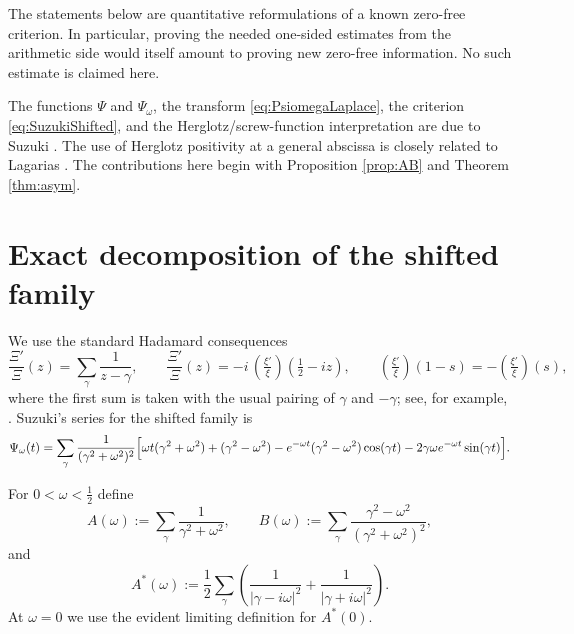 \documentclass[11pt,reqno]{amsart}
\theoremstyle{plain}
\theoremstyle{definition}
\newcommand{\lxi}[1]{\left(\tfrac{\xi'}{\xi}\right)\!#1}
\begin{document}
The statements below are quantitative reformulations of a known zero-free criterion.  In
particular, proving the needed one-sided estimates from the arithmetic side would itself amount to
proving new zero-free information.  No such estimate is claimed here.

The functions $\Psi$ and $\Psi_\omega$, the transform \eqref{eq:PsiomegaLaplace}, the criterion
\eqref{eq:SuzukiShifted}, and the Herglotz/screw-function interpretation are due to Suzuki
\cite{Suzuki2023}.  The use of Herglotz positivity at a general abscissa is closely related to
Lagarias \cite{Lagarias1999}.  The contributions here begin with Proposition \ref{prop:AB} and
Theorem \ref{thm:asym}.

\section{Exact decomposition of the shifted family}\label{sec:decomposition}

We use the standard Hadamard consequences
\begin{equation}\label{eq:hadamard}
 \frac{\Xi'}{\Xi}(z)=\sum_\gamma\frac1{z-\gamma},
 \qquad
 \frac{\Xi'}{\Xi}(z)=-i\,\lxi{\left(\tfrac12-iz\right)},
 \qquad
 \lxi{(1-s)}=-\lxi{(s)},
\end{equation}
where the first sum is taken with the usual pairing of $\gamma$ and $-\gamma$; see, for example,
\cite[\S12]{Davenport}.  Suzuki's series for the shifted family is
\begin{equation}\label{eq:Psiomegaseries}
 \Psi_\omega(t)=\sum_\gamma\frac{1}{(\gamma^2+\omega^2)^2}
 \Bigl[\omega t(\gamma^2+\omega^2)+(\gamma^2-\omega^2)
 -e^{-\omega t}(\gamma^2-\omega^2)\cos(\gamma t)
 -2\gamma\omega e^{-\omega t}\sin(\gamma t)\Bigr].
\end{equation}

For $0<\omega<\tfrac12$ define
\begin{equation}\label{eq:AB}
 A(\omega):=\sum_\gamma\frac1{\gamma^2+\omega^2},
 \qquad
 B(\omega):=\sum_\gamma\frac{\gamma^2-\omega^2}{(\gamma^2+\omega^2)^2},
\end{equation}
and
\begin{equation}\label{eq:Astar}
 A^*(\omega):=\frac12\sum_\gamma
 \left(\frac1{|\gamma-i\omega|^2}+\frac1{|\gamma+i\omega|^2}\right).
\end{equation}
At $\omega=0$ we use the evident limiting definition for $A^*(0)$.
\end{document}
